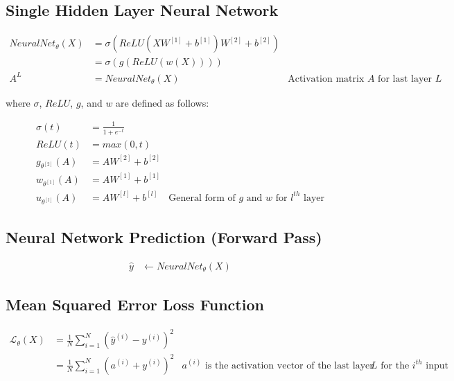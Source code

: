 \documentclass{article}
\begin{document}
\subsection{Single Hidden Layer Neural Network}
\begin{equation}
	\begin{aligned}
		NeuralNet_{\theta}(X) & =
		\sigma(ReLU(XW^{[1]}
		+ {b}^{[1]})W^{[2]} + {b}^{[2]})                                                                  \\
		                      & = \sigma(g(ReLU(w(X))))                                                   \\
		A^{L}                 & = NeuralNet_{\theta}(X) & \text{Activation matrix $A$ for last layer $L$}
	\end{aligned}
\end{equation}

where $\sigma$, $ReLU$, $g$, and $w$ are defined as follows:

\begin{equation}
	\begin{aligned}
		\sigma(t)           & = \frac{1}{1 + e^{-t}}                                                         \\
		ReLU(t)             & = max(0, t)                                                                    \\
		g_{\theta^{[2]}}(A) & = AW^{[2]} + {b}^{[2]}                                                         \\
		w_{\theta^{[1]}}(A) & = AW^{[1]} + {b}^{[1]}                                                         \\
		u_{\theta^{[l]}}(A) & = AW^{[l]} + b^{[l]}   & \text{General form of $g$ and $w$ for $l^{th}$ layer}
	\end{aligned}
\end{equation}

\subsection{Neural Network Prediction (Forward Pass)}
\begin{align}
	\hat{y} & \gets NeuralNet_\theta(X)
\end{align}

\subsection{Mean Squared Error Loss Function}
\begin{equation}
	\begin{aligned}
		\mathcal{L}_\theta(X) & =
		\frac{1}{N} \sum_{i=1}^{N}{ (\hat{y}^{(i)} - y^{(i)} )^{2}}                                                                                                            \\
		                      & = \frac{1}{N} \sum_{i=1}^{N}{(a^{(i)} + y^{(i)})^{2}} & \text{$a^{(i)}$ is the activation vector of the last layer $L$ for the $i^{th}$ input}
	\end{aligned}
\end{equation}
\end{document}
